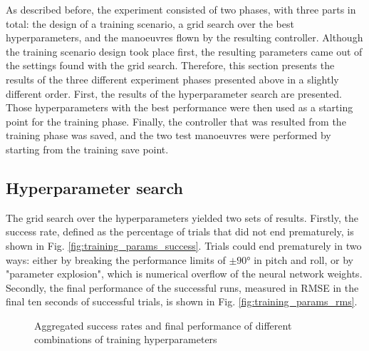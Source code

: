 As described before, the experiment consisted of two phases, with three parts in total: the design of a training scenario, a grid search over the best hyperparameters, and the manoeuvres flown by the resulting controller. Although the training scenario design took place first, the resulting parameters came out of the settings found with the grid search. Therefore, this section presents the results of the three different experiment phases presented above in a slightly different order. First, the results of the hyperparameter search are presented. Those hyperparameters with the best performance were then used as a starting point for the training phase. Finally, the controller that was resulted from the training phase was saved, and the two test manoeuvres were performed by starting from the training save point. 

\subsection{Hyperparameter search} \label{ssec:results:training}
The grid search over the hyperparameters yielded two sets of results. Firstly, the success rate, defined as the percentage of trials that did not end prematurely, is shown in Fig. \ref{fig:training_params_success}. Trials could end prematurely in two ways: either by breaking the performance limits of $\pm90\si{\degree}$ in pitch and roll, or by "parameter explosion", which is numerical overflow of the neural network weights. Secondly, the final performance of the successful runs, measured in RMSE in the final ten seconds of successful trials, is shown in Fig. \ref{fig:training_params_rms}. 

\begin{figure}[th]
    \centering
    \caption{Aggregated success rates and final performance of different combinations of training hyperparameters}
\end{figure}

